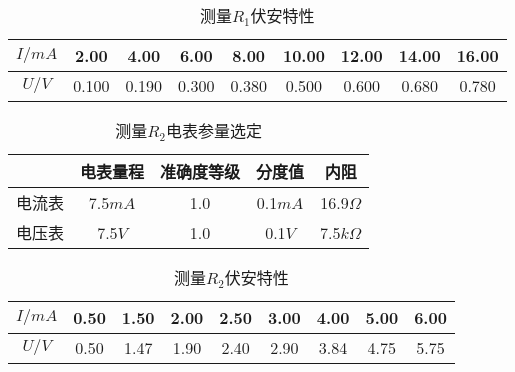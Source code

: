 \documentclass[a4 paper,12pt]{article}
\begin{document}
\begin{table}[H]
	\caption{测量$R_{1}$伏安特性}
	\label{测量$R_{1}$伏安特性}
	\centering
	\begin{tabular}{*{9}{c}}
		\toprule[0.5mm]
		$I/mA$&2.00&4.00&6.00&8.00&10.00&12.00&14.00&16.00\\
		\midrule
		$U/V$&0.100&0.190&0.300&0.380&0.500&0.600&0.680&0.780\\
		\bottomrule[0.5mm]
	\end{tabular}
\end{table}
\begin{table}[H]
	\caption{测量$R_{2}$电表参量选定}
	\label{测量$R_{2}$电表参量选定}
	\centering
	\begin{tabular}{c|cccc}
		\toprule[0.5mm]
		&电表量程&准确度等级&分度值&内阻\\
		\hline
		电流表&7.5$mA$&1.0&0.1$mA$&16.9$\Omega$\\
		电压表&7.5$V$&1.0&0.1$V$&7.5$k\Omega$\\
		\toprule[0.5mm]
	\end{tabular}
\end{table}
\begin{table}[H]
	\caption{测量$R_{2}$伏安特性}
	\label{测量$R_{2}$伏安特性}
	\centering
	\begin{tabular}{*{9}{c}}
		\toprule[0.5mm]
		$I/mA$&0.50&1.50&2.00&2.50&3.00&4.00&5.00&6.00\\
		\midrule
		$U/V$&0.50&1.47&1.90&2.40&2.90&3.84&4.75&5.75\\
		\bottomrule[0.5mm]
	\end{tabular}
\end{table}
\end{document}

